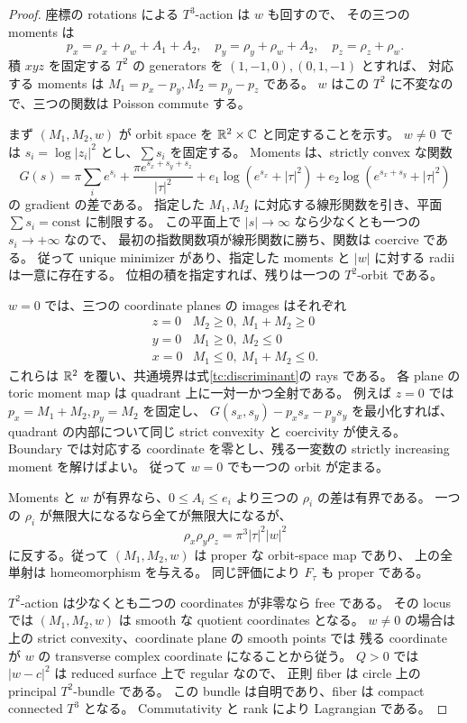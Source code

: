 \begin{proof}
座標の rotations による $T^3$-action は $w$ も回すので、
その三つの moments は
\[
 p_x=\rho_x+\rho_w+A_1+A_2,\quad
 p_y=\rho_y+\rho_w+A_2,\quad
 p_z=\rho_z+\rho_w.
\]
積 $xyz$ を固定する $T^2$ の generators を $(1,-1,0),(0,1,-1)$ とすれば、
対応する moments は $M_1=p_x-p_y,M_2=p_y-p_z$ である。
$w$ はこの $T^2$ に不変なので、三つの関数は Poisson commute する。

まず $(M_1,M_2,w)$ が orbit space を $\mathbb R^2\times\mathbb C$ と同定することを示す。
$w\ne0$ では $s_i=\log|z_i|^2$ とし、$\sum s_i$ を固定する。
Moments は、strictly convex な関数
\[
 G(s)=\pi\sum_i e^{s_i}
 +\frac{\pi e^{s_x+s_y+s_z}}{|\tau|^2}
 +e_1\log(e^{s_x}+|\tau|^2)
 +e_2\log(e^{s_x+s_y}+|\tau|^2)
\]
の gradient の差である。
指定した $M_1,M_2$ に対応する線形関数を引き、平面 $\sum s_i=\mathrm{const}$ に制限する。
この平面上で $|s|\to\infty$ なら少なくとも一つの $s_i\to+\infty$ なので、
最初の指数関数項が線形関数に勝ち、関数は coercive である。
従って unique minimizer があり、指定した moments と $|w|$ に対する radii は一意に存在する。
位相の積を指定すれば、残りは一つの $T^2$-orbit である。

$w=0$ では、三つの coordinate planes の images はそれぞれ
\[
\begin{array}{c|c}
z=0&M_2\ge0,\ M_1+M_2\ge0\\
y=0&M_1\ge0,\ M_2\le0\\
x=0&M_1\le0,\ M_1+M_2\le0.
\end{array}
\]
これらは $\mathbb R^2$ を覆い、共通境界は式\eqref{tc:discriminant}の rays である。
各 plane の toric moment map は quadrant 上に一対一かつ全射である。
例えば $z=0$ では $p_x=M_1+M_2,p_y=M_2$ を固定し、
$G(s_x,s_y)-p_xs_x-p_ys_y$ を最小化すれば、quadrant の内部について同じ strict convexity と coercivity が使える。
Boundary では対応する coordinate を零とし、残る一変数の strictly increasing moment を解けばよい。
従って $w=0$ でも一つの orbit が定まる。

Moments と $w$ が有界なら、$0\le A_i\le e_i$ より三つの $\rho_i$ の差は有界である。
一つの $\rho_i$ が無限大になるなら全てが無限大になるが、
\[
 \rho_x\rho_y\rho_z=\pi^3|\tau|^2|w|^2
\]
に反する。従って $(M_1,M_2,w)$ は proper な orbit-space map であり、
上の全単射は homeomorphism を与える。
同じ評価により $F_\tau$ も proper である。

$T^2$-action は少なくとも二つの coordinates が非零なら free である。
その locus では $(M_1,M_2,w)$ は smooth な quotient coordinates となる。
$w\ne0$ の場合は上の strict convexity、coordinate plane の smooth points では
残る coordinate が $w$ の transverse complex coordinate になることから従う。
$Q>0$ では $|w-c|^2$ は reduced surface 上で regular なので、
正則 fiber は circle 上の principal $T^2$-bundle である。
この bundle は自明であり、fiber は compact connected $T^3$ となる。
Commutativity と rank により Lagrangian である。


\end{proof}
